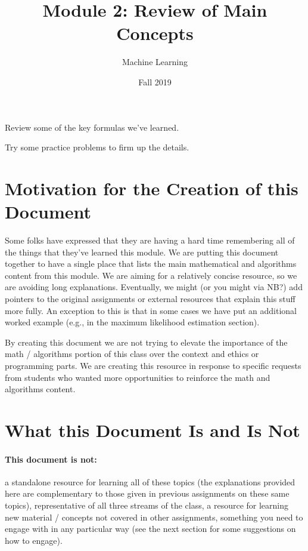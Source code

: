 \documentclass{tufte-handout}
\title{Module 2: Review of Main Concepts}
\author{Machine Learning}
\date{Fall 2019}
\begin{document}
\maketitle
\thispagestyle{firstpage}

\begin{learningobjectives}
\bi
\item Review some of the key formulas we've learned.
\item Try some practice problems to firm up the details.
\ei
\end{learningobjectives}

\section{Motivation for the Creation of this Document}

Some folks have expressed that they are having a hard time remembering all of the things that they've learned this module.  We are putting this document together to have a single place that lists the main mathematical and algorithms content from this module.  We are aiming for a relatively concise resource, so we are avoiding long explanations.  Eventually, we might (or you might via NB?) add pointers to the original assignments or external resources that explain this stuff more fully.  An exception to this is that in some cases we have put an additional worked example (e.g., in the maximum likelihood estimation section).

\vspace{1em}
\begin{notice}
By creating this document we are not trying to elevate the importance of the math / algorithms portion of this class over the context and ethics or programming parts.  We are creating this resource in response to specific requests from students who wanted more opportunities to reinforce the math and algorithms content.
\end{notice}

\section{What this Document Is and Is Not}

 \paragraph{\textbf{This document is not:}} a standalone resource for learning all of these topics (the explanations provided here are complementary to those given in previous assignments on these same topics), representative of all three streams of the class, a resource for learning new material / concepts not covered in other assignments, something you need to engage with in any particular way (see the next section for some suggestions on how to engage).
\end{document}
